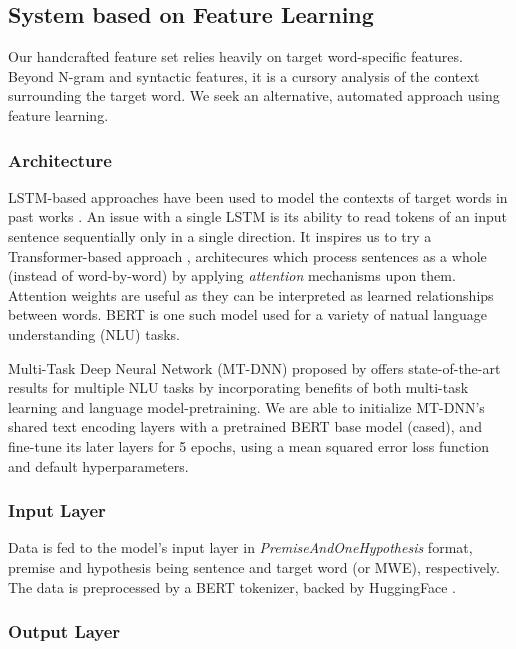\documentclass[11pt,a4paper]{article}
\begin{document}
\subsection{System based on Feature Learning}

Our handcrafted feature set relies heavily on target word-specific features. Beyond N-gram and syntactic features, it is a cursory analysis of the context surrounding the target word. We seek an alternative, automated approach using feature learning.

\subsubsection{Architecture}

LSTM-based approaches have been used to model the contexts of target words in past works \citep{hartmanndossantos2018nilc, dehertogtack2018deep}. An issue with a single LSTM is its ability to read tokens of an input sentence sequentially only in a single direction. It inspires us to try a Transformer-based approach \citep{DBLP:journals/corr/VaswaniSPUJGKP17}, architecures which process sentences as a whole (instead of word-by-word) by applying \textit{attention} mechanisms upon them. Attention weights are useful as they can be interpreted as learned relationships between words. BERT \citep{DBLP:journals/corr/abs-1810-04805} is one such model used for a variety of natual language understanding (NLU) tasks.

Multi-Task Deep Neural Network (MT-DNN) proposed by \citet{liuetal2019multitask} offers state-of-the-art results for multiple NLU tasks by incorporating benefits of both multi-task learning and language model-pretraining. We are able to initialize MT-DNN's shared text encoding layers with a pretrained BERT base model (cased), and fine-tune its later layers for 5 epochs, using a mean squared error loss function and default hyperparameters.

\subsubsection{Input Layer}

Data is fed to the model's input layer in \textit{PremiseAndOneHypothesis} format, premise and hypothesis being sentence and target word (or MWE), respectively. The data is preprocessed by a BERT tokenizer, backed by HuggingFace \citep{wolf_etal_2020_transformers}.

\subsubsection{Output Layer}
\end{document}
